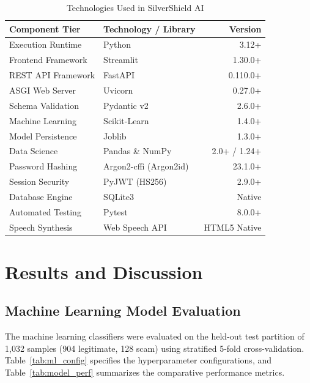 \documentclass[conference]{IEEEtran}
\providecommand{\toprule}{\hline\hline}
\providecommand{\midrule}{\hline}
\providecommand{\bottomrule}{\hline\hline}
\begin{document}
\begin{table}[h]
\caption{Technologies Used in SilverShield AI}
\label{tab:tech_stack}
\centering
\small
\begin{tabular}{llr}
\toprule
\textbf{Component Tier} & \textbf{Technology / Library} & \textbf{Version} \\
\midrule
Execution Runtime & Python & 3.12+ \\
Frontend Framework & Streamlit & 1.30.0+ \\
REST API Framework & FastAPI & 0.110.0+ \\
ASGI Web Server & Uvicorn & 0.27.0+ \\
Schema Validation & Pydantic v2 & 2.6.0+ \\
Machine Learning & Scikit-Learn & 1.4.0+ \\
Model Persistence & Joblib & 1.3.0+ \\
Data Science & Pandas \& NumPy & 2.0+ / 1.24+ \\
Password Hashing & Argon2-cffi (Argon2id) & 23.1.0+ \\
Session Security & PyJWT (HS256) & 2.9.0+ \\
Database Engine & SQLite3 & Native \\
Automated Testing & Pytest & 8.0.0+ \\
Speech Synthesis & Web Speech API & HTML5 Native \\
\bottomrule
\end{tabular}
\end{table}

\section{Results and Discussion}

\subsection{Machine Learning Model Evaluation}
The machine learning classifiers were evaluated on the held-out test partition of 1,032 samples (904 legitimate, 128 scam) using stratified 5-fold cross-validation. Table~\ref{tab:ml_config} specifies the hyperparameter configurations, and Table~\ref{tab:model_perf} summarizes the comparative performance metrics.
\end{document}
